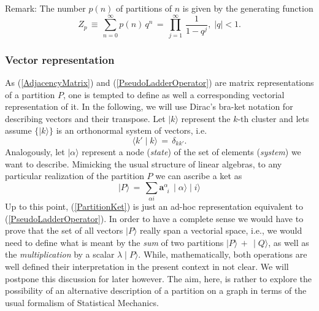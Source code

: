 \documentclass[twocolumn,aps,sort,nofootinbib]{revtex4}
\begin{document}
Remark: The number $p(n)$ of partitions of $n$ is given by the generating function
\begin{equation}
Z_p\,\equiv\,\sum^{\infty}_{n=0}p(n)\,q^n\,=\,\prod^{\infty}_{j=1}\,\frac{1}{1-q^j},\;|q|<1.
\end{equation}

\subsubsection{Vector representation}
As (\ref{AdjacencyMatrix}) and (\ref{PseudoLadderOperator}) are
matrix representations of a partition $P$, one is tempted to define 
as well a corresponding vectorial
representation of it. In the following, we will use Dirac's bra-ket notation
for describing vectors and their transpose.
Let $\mid k \rangle$ represent the $k$-th cluster and lets assume $\{\mid k\rangle\}$
is an orthonormal system of vectors, i.e.
\begin{equation}
\langle k'\mid k\rangle\,=\,\delta_{kk'}.
\label{orthonormal}
\end{equation}
Analogously, let $\mid\alpha\rangle$ represent a node ({\sl state}) of the
set of elements ({\sl system}) we want to describe.
Mimicking the usual structure of linear algebras, 
to any particular realization of the partition $P$ we can ascribe a ket as
\begin{equation}
\mid P\rangle\,=\,\sum_{\alpha i}\mathbf{a}^\alpha_{\phantom{a}i}\,\mid\alpha\rangle\mid i\rangle
\label{PartitionKet}
\end{equation}
Up to this point, (\ref{PartitionKet}) is just an ad-hoc representation equivalent
to (\ref{PseudoLadderOperator}). In order to have a complete sense we would have
to prove that the set of all vectors $\mid P\rangle$ really span a vectorial space, i.e.,
we would need to define what is meant by the {\sl sum} of two partitions 
$\mid P\rangle\,+\,\mid Q\rangle$, as well as the {\sl multiplication} by a scalar 
$\lambda \mid P\rangle$. While, mathematically, both operations are well defined their
interpretation in the present context in not clear. 
We will postpone this discussion for later however. The aim,
here, is rather to explore the possibility of an alternative description of a partition on a graph
in terms of the usual formalism of Statistical Mechanics. 
\end{document}
